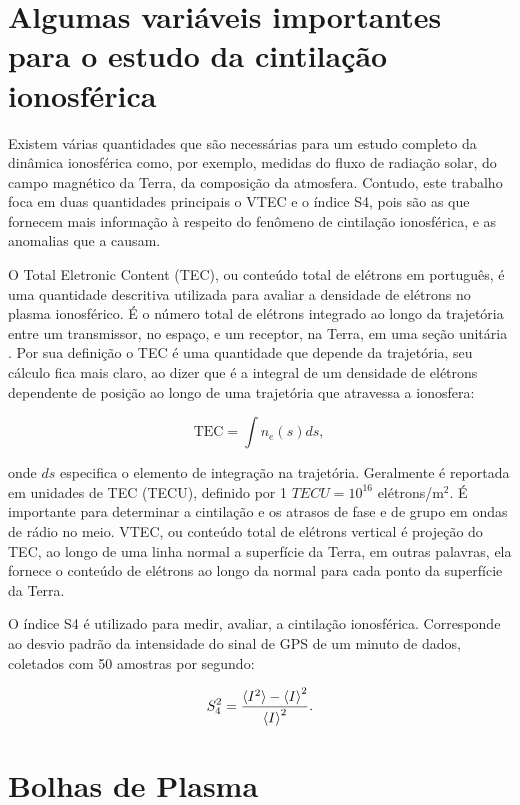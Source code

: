 \section{Algumas variáveis importantes para o estudo da cintilação ionosférica}

Existem várias quantidades que são necessárias para um estudo completo da dinâmica ionosférica como, por exemplo, medidas do fluxo de radiação solar, do campo magnético da Terra, da composição da atmosfera. Contudo, este trabalho foca em duas quantidades principais o VTEC e o índice S4, pois são as que fornecem mais informação à respeito do fenômeno de cintilação ionosférica, e as anomalias que a causam.

O Total Eletronic Content (TEC), ou conteúdo total de elétrons em português, é uma quantidade descritiva utilizada para avaliar a densidade de elétrons no plasma ionosférico. É o número total de elétrons integrado ao longo da trajetória entre um transmissor, no espaço, e um receptor, na Terra, em uma seção unitária \cite{HOFMANN:2013}. Por sua definição o TEC é uma quantidade que depende da trajetória, seu cálculo fica mais claro, ao dizer que é a integral de um densidade de elétrons dependente de posição ao longo de uma trajetória que atravessa a ionosfera:

\begin{equation}
    \mbox{TEC}=\int{n_{e}(s)}ds\mbox{,}~
\end{equation}

onde $ds$ especifica o elemento de integração na trajetória. Geralmente é reportada em unidades de TEC (TECU), definido por 1 $TECU=10^{16}$ elétrons/m$^2$. É importante para determinar a cintilação e os atrasos de fase e de grupo em ondas de rádio no meio. VTEC, ou conteúdo total de elétrons vertical é projeção do TEC, ao longo de uma linha normal a superfície da Terra, em outras palavras, ela fornece o conteúdo de elétrons ao longo da normal para cada ponto da superfície da Terra.

O índice S4 é utilizado para medir, avaliar, a cintilação ionosférica. Corresponde ao desvio padrão da intensidade do sinal de GPS de um minuto de dados, coletados com 50 amostras por segundo:

\begin{equation}
    S_4^2=\frac{\braket{I^2}-\braket{I}^2}{\braket{I}^2}\mbox{.}
\end{equation}

\section{Bolhas de Plasma}

